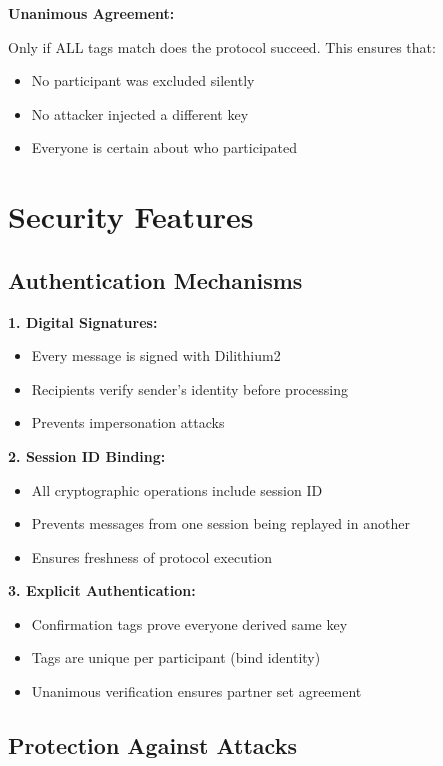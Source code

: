 \documentclass[12pt,a4paper]{report}
\begin{document}
\textbf{Unanimous Agreement:}

Only if ALL tags match does the protocol succeed. This ensures that:
\begin{itemize}
\item No participant was excluded silently
\item No attacker injected a different key
\item Everyone is certain about who participated
\end{itemize}

\section{Security Features}

\subsection{Authentication Mechanisms}

\textbf{1. Digital Signatures:}
\begin{itemize}
\item Every message is signed with Dilithium2
\item Recipients verify sender's identity before processing
\item Prevents impersonation attacks
\end{itemize}

\textbf{2. Session ID Binding:}
\begin{itemize}
\item All cryptographic operations include session ID
\item Prevents messages from one session being replayed in another
\item Ensures freshness of protocol execution
\end{itemize}

\textbf{3. Explicit Authentication:}
\begin{itemize}
\item Confirmation tags prove everyone derived same key
\item Tags are unique per participant (bind identity)
\item Unanimous verification ensures partner set agreement
\end{itemize}

\subsection{Protection Against Attacks}
\end{document}
